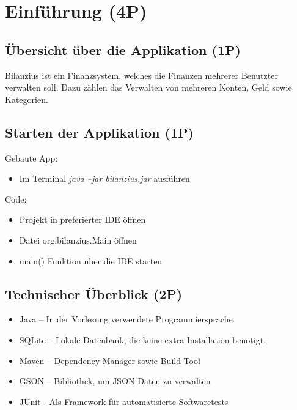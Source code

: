 \section{Einführung (4P)}

\subsection{Übersicht über die Applikation (1P)}
Bilanzius ist ein Finanzsystem, welches die Finanzen mehrerer Benutzter verwalten soll. Dazu zählen das Verwalten von mehreren Konten, Geld sowie Kategorien.

\subsection{Starten der Applikation (1P)}
Gebaute App:  
\begin{itemize}
    \item Im Terminal \textit{java –jar bilanzius.jar} ausführen
\end{itemize}
Code: 
\begin{itemize}
    \item Projekt in preferierter IDE öffnen
    \item Datei org.bilanzius.Main öffnen
    \item main() Funktion über die IDE starten
\end{itemize}

\subsection{Technischer Überblick (2P)}
\begin{itemize}
    \item Java – In der Vorlesung verwendete Programmiersprache.
    \item SQLite – Lokale Datenbank, die keine extra Installation benötigt.
    \item Maven – Dependency Manager sowie Build Tool
    \item GSON – Bibliothek, um JSON-Daten zu verwalten
    \item JUnit - Als Framework für automatisierte Softwaretests
\end{itemize}
